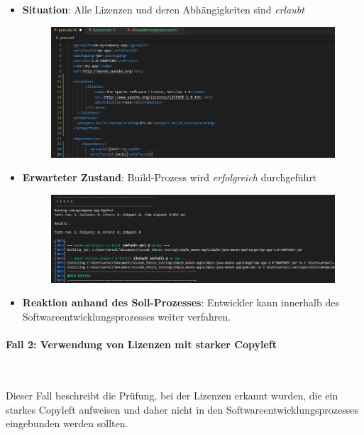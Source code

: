 \begin{itemize}
    \item \textbf{Situation}: Alle Lizenzen und deren Abhängigkeiten sind \textit{erlaubt}
    
    \begin{figure}[h]
        \centering
        \includegraphics[scale=0.5]{Bilder/Fall1Situation.png}
    \end{figure}

    \item \textbf{Erwarteter Zustand}: Build-Prozess wird \textit{erfolgreich} durchgeführt 
    
    \begin{figure}[h]
        \centering
        \includegraphics[scale=0.5]{Bilder/Fall1Zustand.png}
    \end{figure}

    \item \textbf{Reaktion anhand des Soll-Prozesses}: Entwickler kann innerhalb des Softwareentwicklungsprozesses weiter verfahren. 
\end{itemize}

\paragraph{Fall 2: Verwendung von Lizenzen mit starker Copyleft} $~$

Dieser Fall beschreibt die Prüfung, bei der Lizenzen erkannt wurden, die ein starkes Copyleft aufweisen und daher nicht in den Softwareentwicklungsprozesses eingebunden werden sollten.

